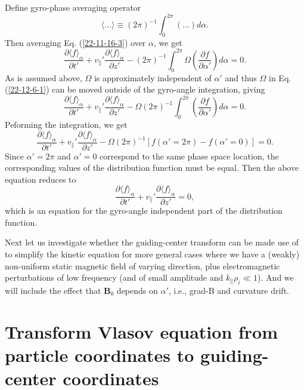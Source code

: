\documentclass{article}
\begin{document}
Define gyro-phase averaging operator
\begin{equation}
  \langle \ldots \rangle \equiv (2 \pi)^{- 1} \int_0^{2 \pi} (\ldots) d \alpha
  .
\end{equation}
Then averaging Eq. (\ref{22-11-16-3}) over $\alpha$, we get
\begin{equation}
  \label{22-12-6-1} \frac{\partial \langle f \rangle_{\alpha}}{\partial t'} +
  v_{\parallel}' \frac{\partial \langle f \rangle_{\alpha}}{\partial z'} - (2
  \pi)^{- 1} \int_0^{2 \pi} \Omega \left( \frac{\partial f}{\partial \alpha'}
  \right) d \alpha = 0.
\end{equation}
As is assumed above, $\Omega$ is approximately independent of $\alpha'$ and
thus $\Omega$ in Eq. (\ref{22-12-6-1}) can be moved outside of the gyro-angle
integration, giving
\begin{equation}
  \frac{\partial \langle f \rangle_{\alpha}}{\partial t'} + v_{\parallel}'
  \frac{\partial \langle f \rangle_{\alpha}}{\partial z'} - \Omega (2 \pi)^{-
  1} \int_0^{2 \pi} \left( \frac{\partial f}{\partial \alpha'} \right) d
  \alpha = 0.
\end{equation}
Peforming the integration, we get
\begin{equation}
  \frac{\partial \langle f \rangle_{\alpha}}{\partial t'} + v_{\parallel}'
  \frac{\partial \langle f \rangle_{\alpha}}{\partial z'} - \Omega (2 \pi)^{-
  1} [f (\alpha' = 2 \pi) - f (\alpha' = 0)] = 0.
\end{equation}
Since $\alpha' = 2 \pi$ and $\alpha' = 0$ correspond to the same phase space
location, the corresponding values of the distribution function must be equal.
Then the above equation reduces to
\begin{equation}
  \frac{\partial \langle f \rangle_{\alpha}}{\partial t'} + v_{\parallel}'
  \frac{\partial \langle f \rangle_{\alpha}}{\partial z'} = 0,
\end{equation}
which is an equation for the gyro-angle independent part of the distribution
function.

Next let us investigate whether the guiding-center transform can be made use
of to simplify the kinetic equation for more general cases where we have a
(weakly) non-uniform static magnetic field of varying direction, plus
electromagnetic perturbations of low frequency (and of small amplitude and
$k_{\parallel} \rho_i \ll 1$). And we will include the effect that
$\mathbf{B}_0$ depends on $\alpha'$, i.e., grad-B and curvature drift.

\section{Transform Vlasov equation from particle coordinates to guiding-center
coordinates}
\end{document}
